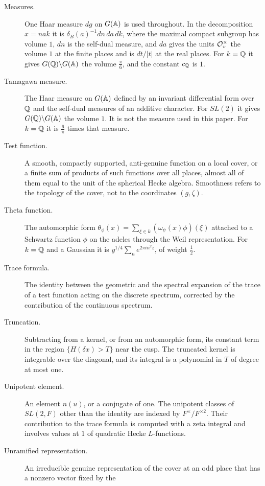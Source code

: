 \begin{description}
\item[Measures.] One Haar measure $dg$ on $G(\mathbb{A})$ is used throughout. In
  the decomposition $x=nak$ it is $\delta_B(a)^{-1}dn\,da\,dk$, where the
  maximal compact subgroup has volume $1$, $dn$ is the self-dual measure,
  and $da$ gives the units $\mathcal{O}_v^\times$ the volume $1$ at the finite
  places and is $dt/|t|$ at the real places. For $k=\mathbb{Q}$ it gives
  $G(\mathbb{Q})\backslash G(\mathbb{A})$ the volume $\frac\pi6$, and the constant $c_{\mathbb{Q}}$
  is $1$.
\item[Tamagawa measure.] The Haar measure on $G(\mathbb{A})$ defined by an
  invariant differential form over $\mathbb{Q}$ and the self-dual measures of an
  additive character. For $SL(2)$ it gives $G(\mathbb{Q})\backslash G(\mathbb{A})$ the
  volume $1$. It is not the measure used in this paper. For $k=\mathbb{Q}$ it is
  $\frac6\pi$ times that measure.
\item[Test function.] A smooth, compactly supported, anti-genuine
  function on a local cover, or a finite sum of products of such
  functions over all places, almost all of them equal to the unit of the
  spherical Hecke algebra. Smoothness refers to the topology of the
  cover, not to the coordinates $(g,\zeta)$.
\item[Theta function.] The automorphic form $\theta_\phi(x)=\sum_{\xi\in
  k}(\omega_\psi(x)\phi)(\xi)$ attached to a Schwartz function $\phi$ on
  the adeles through the Weil representation. For $k=\mathbb{Q}$ and a Gaussian
  it is $y^{1/4}\sum_ne^{2\pi in^2z}$, of weight $\frac12$.
\item[Trace formula.] The identity between the geometric and the spectral
  expansion of the trace of a test function acting on the discrete
  spectrum, corrected by the contribution of the continuous spectrum.
\item[Truncation.] Subtracting from a kernel, or from an automorphic
  form, its constant term in the region $\{H(\delta x)>T\}$ near the
  cusp. The truncated kernel is integrable over the diagonal, and its
  integral is a polynomial in $T$ of degree at most one.
\item[Unipotent element.] An element $n(u)$, or a conjugate of one. The
  unipotent classes of $SL(2,F)$ other than the identity are indexed by
  $F^\times/F^{\times2}$. Their contribution to the trace formula is
  computed with a zeta integral and involves values at $1$ of quadratic
  Hecke $L$-functions.
\item[Unramified representation.] An irreducible genuine representation
  of the cover at an odd place that has a nonzero vector fixed by the

\end{description}
